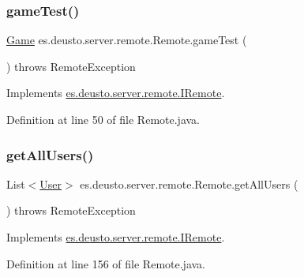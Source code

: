 \subsubsection{\texorpdfstring{game\+Test()}{gameTest()}}
{\footnotesize\ttfamily \hyperlink{classes_1_1deusto_1_1server_1_1db_1_1data_1_1_game}{Game} es.\+deusto.\+server.\+remote.\+Remote.\+game\+Test (\begin{DoxyParamCaption}{ }\end{DoxyParamCaption}) throws Remote\+Exception}



Implements \hyperlink{interfacees_1_1deusto_1_1server_1_1remote_1_1_i_remote_a253273caee8c2bceaa3b03922b2e3108}{es.\+deusto.\+server.\+remote.\+I\+Remote}.



Definition at line 50 of file Remote.\+java.

\mbox{\label{classes_1_1deusto_1_1server_1_1remote_1_1_remote_a5c284c933c6f1f9651634dc764e526d5}} 
\subsubsection{\texorpdfstring{get\+All\+Users()}{getAllUsers()}}
{\footnotesize\ttfamily List$<$\hyperlink{classes_1_1deusto_1_1server_1_1db_1_1data_1_1_user}{User}$>$ es.\+deusto.\+server.\+remote.\+Remote.\+get\+All\+Users (\begin{DoxyParamCaption}{ }\end{DoxyParamCaption}) throws Remote\+Exception}



Implements \hyperlink{interfacees_1_1deusto_1_1server_1_1remote_1_1_i_remote_a0ef7c091b38259be1d5ea89a2bda14e1}{es.\+deusto.\+server.\+remote.\+I\+Remote}.



Definition at line 156 of file Remote.\+java.

\mbox{\label{classes_1_1deusto_1_1server_1_1remote_1_1_remote_a09318956131f355c8b43f93e3c3afea4}} 
